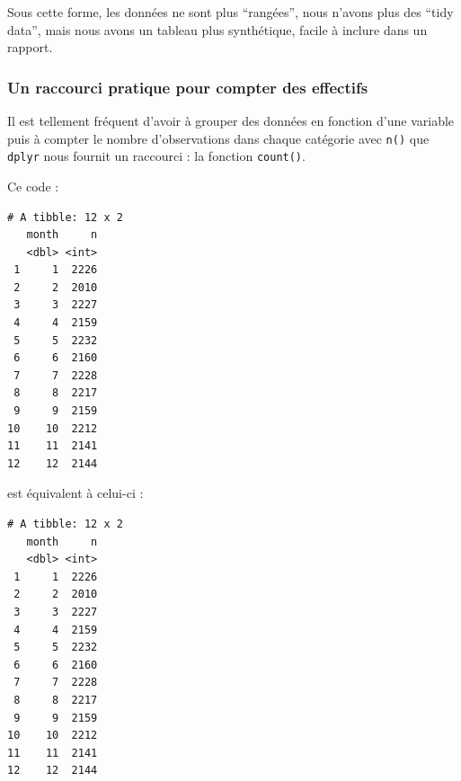 \documentclass[a4paperpaper,]{article}
\newenvironment{Shaded}{\begin{snugshade}}{\end{snugshade}}
\newcommand{\DataTypeTok}[1]{\textcolor[rgb]{0.00,0.34,0.68}{#1}}
\newcommand{\KeywordTok}[1]{\textcolor[rgb]{0.12,0.11,0.11}{\textbf{#1}}}
\newcommand{\NormalTok}[1]{\textcolor[rgb]{0.12,0.11,0.11}{#1}}
\newcommand{\OperatorTok}[1]{\textcolor[rgb]{0.12,0.11,0.11}{#1}}
\newcommand{\StringTok}[1]{\textcolor[rgb]{0.75,0.01,0.01}{#1}}
\begin{document}
Sous cette forme, les données ne sont plus ``rangées'', nous n'avons plus des ``tidy data'', mais nous avons un tableau plus synthétique, facile à inclure dans un rapport.

\hypertarget{un-raccourci-pratique-pour-compter-des-effectifs}{%
\subsubsection{Un raccourci pratique pour compter des effectifs}\label{un-raccourci-pratique-pour-compter-des-effectifs}}

Il est tellement fréquent d'avoir à grouper des données en fonction d'une variable puis à compter le nombre d'observations dans chaque catégorie avec \texttt{n()} que \texttt{dplyr} nous fournit un raccourci : la fonction \texttt{count()}.

Ce code :

\begin{Shaded}
\end{Shaded}

\begin{verbatim}
# A tibble: 12 x 2
   month     n
   <dbl> <int>
 1     1  2226
 2     2  2010
 3     3  2227
 4     4  2159
 5     5  2232
 6     6  2160
 7     7  2228
 8     8  2217
 9     9  2159
10    10  2212
11    11  2141
12    12  2144
\end{verbatim}

est équivalent à celui-ci :

\begin{Shaded}
\end{Shaded}

\begin{verbatim}
# A tibble: 12 x 2
   month     n
   <dbl> <int>
 1     1  2226
 2     2  2010
 3     3  2227
 4     4  2159
 5     5  2232
 6     6  2160
 7     7  2228
 8     8  2217
 9     9  2159
10    10  2212
11    11  2141
12    12  2144
\end{verbatim}
\end{document}
